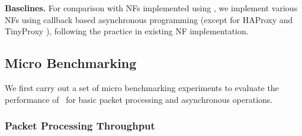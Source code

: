 \noindent \textbf{Baselines.} For comparison with NFs implemented using \netstar, we implement various NFs using callback based asynchronous programming (except for HAProxy \cite{haproxy} and TinyProxy \cite{tinyproxy}), following the practice in existing NF implementation.

\subsection{Micro Benchmarking}
\label{sec:eval1}

We first carry out a set of micro benchmarking experiments to evaluate the performance of \netstar~for basic packet processing and asynchronous operations.

\subsubsection{Packet Processing Throughput}

